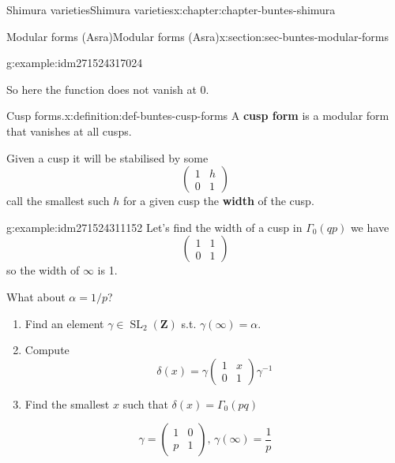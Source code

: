 \documentclass[oneside,10pt,]{book}
\newcommand{\terminology}[1]{\textbf{#1}}
\numberwithin{equation}{section}
\newcommand{\inv}{^{-1}}
\newcommand{\ZZ}{\mathbf{Z}}
\DeclareMathOperator{\SL}{SL}
\newcommand{\amp}{&}
\begin{document}
\begin{chapterptx}{Shimura varieties}{}{Shimura varieties}{}{}{x:chapter:chapter-buntes-shimura}
\begin{sectionptx}{Modular forms (Asra)}{}{Modular forms (Asra)}{}{}{x:section:sec-buntes-modular-forms}
\begin{example}{}{g:example:idm271524317024}
\begin{equation*}
\end{equation*}
%
\par
So here the function does not vanish at 0.%
\end{example}
\begin{definition}{Cusp forms.}{x:definition:def-buntes-cusp-forms}%
A \terminology{cusp form} is a modular form that vanishes at all cusps.%
\end{definition}
Given a cusp it will be stabilised by some%
\begin{equation*}
\begin{pmatrix} 1\amp h \\ 0 \amp 1 \end{pmatrix}
\end{equation*}
call the smallest such \(h\) for a given cusp the \terminology{width} of the cusp.%
\begin{example}{}{g:example:idm271524311152}%
Let's find the width of a cusp in \(\Gamma_0(qp)\) we have%
\begin{equation*}
\begin{pmatrix} 1\amp 1 \\ 0 \amp 1 \end{pmatrix}
\end{equation*}
so the width of \(\infty\) is 1.%
\par
What about \(\alpha = 1/p\)?%
\begin{enumerate}
\item{}Find an element \(\gamma \in \SL_2(\ZZ)\) s.t. \(\gamma(\infty) = \alpha\).%
\item{}Compute%
\begin{equation*}
\delta(x) = \gamma \begin{pmatrix} 1\amp x \\ 0 \amp 1 \end{pmatrix} \gamma\inv
\end{equation*}
%
\item{}Find the smallest \(x\) such that \(\delta(x) = \Gamma_0(pq)\)%
\end{enumerate}
%
\begin{equation*}
\gamma = \begin{pmatrix} 1\amp 0 \\ p \amp 1 \end{pmatrix},\, \gamma(\infty) = \frac 1p
\end{equation*}
%
\begin{equation*}

\end{equation*}
\end{example}
\end{sectionptx}
\end{chapterptx}
\end{document}
